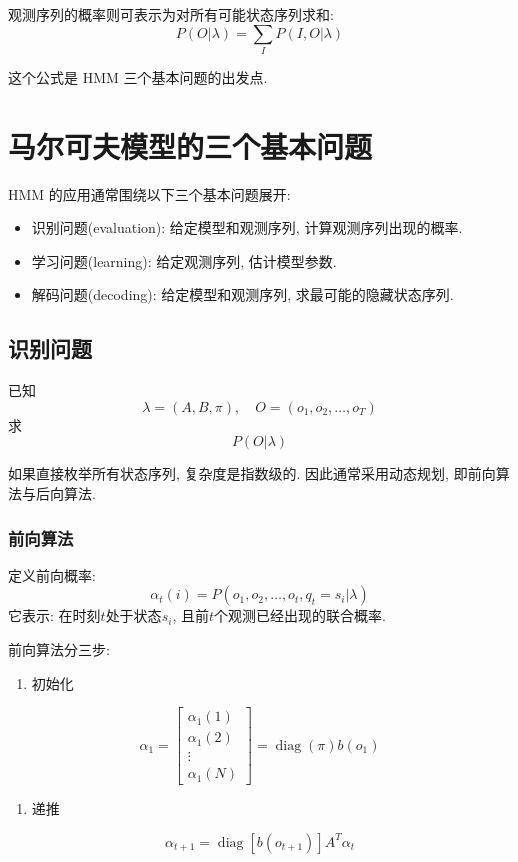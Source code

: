 观测序列的概率则可表示为对所有可能状态序列求和:
\[
P(O | \lambda) = \sum_I P(I, O | \lambda)
\]

这个公式是 HMM 三个基本问题的出发点.

\section{马尔可夫模型的三个基本问题}


HMM 的应用通常围绕以下三个基本问题展开:

\begin{itemize}
\item 识别问题(evaluation): 给定模型和观测序列, 计算观测序列出现的概率.
\item 学习问题(learning): 给定观测序列, 估计模型参数.
\item 解码问题(decoding): 给定模型和观测序列, 求最可能的隐藏状态序列.
\end{itemize}

\subsection{识别问题}


已知
\[
\lambda = (A, B, \pi), \quad O = (o_1, o_2, \dots, o_T)
\]
求
\[
P(O | \lambda)
\]

如果直接枚举所有状态序列, 复杂度是指数级的.
因此通常采用动态规划, 即前向算法与后向算法.

\subsubsection{前向算法}


定义前向概率:
\[
\alpha_t (i) = P(o_1, o_2, \dots, o_t, q_t = s_i | \lambda)
\]
它表示: 在时刻$t$处于状态$s_i$, 且前$t$个观测已经出现的联合概率.

前向算法分三步:

\begin{enumerate}
\item[1.] 初始化
\end{enumerate}
\[
\alpha_1 =
\begin{bmatrix}\alpha_1(1) \\ \alpha_1(2) \\ \vdots \\ \alpha_1(N)\end{bmatrix}
= \operatorname{diag}(\pi) b(o_1)
\]

\begin{enumerate}
\item[2.] 递推
\end{enumerate}
\[
\alpha_{t+1} = \operatorname{diag}[b(o_{t+1})] A^T \alpha_t
\]

